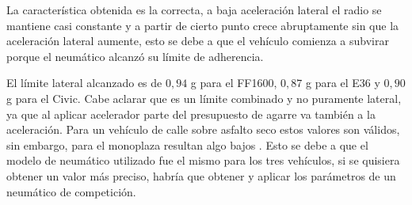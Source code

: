 La característica obtenida es la correcta, a baja aceleración lateral el radio se mantiene casi constante y a partir de cierto punto crece abruptamente sin que la aceleración lateral aumente, esto se debe a que el vehículo comienza a subvirar porque el neumático alcanzó su límite de adherencia.


El límite lateral alcanzado es de  $0{,}94$ g para el FF1600, $0{,}87$ g para el E36 y $0{,}90$ g para el Civic. Cabe aclarar que es un límite combinado y no puramente lateral, ya que al aplicar acelerador parte del presupuesto de agarre va también a la aceleración. Para un vehículo de calle sobre asfalto seco estos valores son válidos, sin embargo, para el monoplaza resultan algo bajos \cite{hyperphysics_tires}. Esto se debe a que el modelo de neumático utilizado fue el mismo para los tres vehículos, si se quisiera obtener un valor más preciso, habría que obtener y aplicar los parámetros de un neumático de competición.





